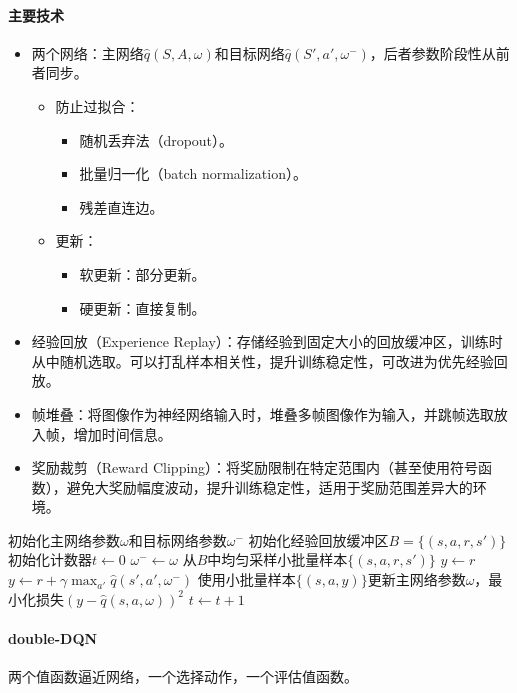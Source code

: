 \documentclass[
12pt, %
a4paper, 
oneside, %
headinclude,footinclude, %
]{scrartcl}
\begin{document}
\paragraph{主要技术}
\begin{itemize}
\item 两个网络：主网络$ \hat{q}(S, A, \omega) $和目标网络$ \hat{q}(S', a', \omega^-) $，后者参数阶段性从前者同步。
\begin{itemize}
\item 防止过拟合：
\begin{itemize}
\item 随机丢弃法（dropout）。
\item 批量归一化（batch normalization）。
\item 残差直连边。
\end{itemize}
\item 更新：
\begin{itemize}
\item 软更新：部分更新。
\item 硬更新：直接复制。
\end{itemize}
\end{itemize}
\item 经验回放（Experience Replay）：存储经验到固定大小的回放缓冲区，训练时从中随机选取。可以打乱样本相关性，提升训练稳定性，可改进为优先经验回放。
\item 帧堆叠：将图像作为神经网络输入时，堆叠多帧图像作为输入，并跳帧选取放入帧，增加时间信息。
\item 奖励裁剪（Reward Clipping）：将奖励限制在特定范围内（甚至使用符号函数），避免大奖励幅度波动，提升训练稳定性，适用于奖励范围差异大的环境。
\end{itemize}
\begin{myalgorithm}[DQN]
\State 初始化主网络参数$ \omega $和目标网络参数$ \omega^- $
\State 初始化经验回放缓冲区$ B = \{(s, a, r, s')\} $
\State 初始化计数器$ t \gets 0 $
\Loop
{} 
\State $ \omega^- \gets \omega $
\EndIf
\State 从$ B $中均匀采样小批量样本$ \{(s, a, r, s')\} $
\State $ y \gets r $
\Else
\State $ y \gets r + \gamma \max_{a'} \hat{q}(s', a', \omega^-) $ 
\EndIf
\EndFor
\State 使用小批量样本$ \{(s, a, y)\} $更新主网络参数$ \omega $，最小化损失$ (y - \hat{q}(s, a, \omega))^2 $
\State $ t \gets t + 1 $
\EndLoop
\end{myalgorithm}
\paragraph{double-DQN}
两个值函数逼近网络，一个选择动作，一个评估值函数。
\end{document}
